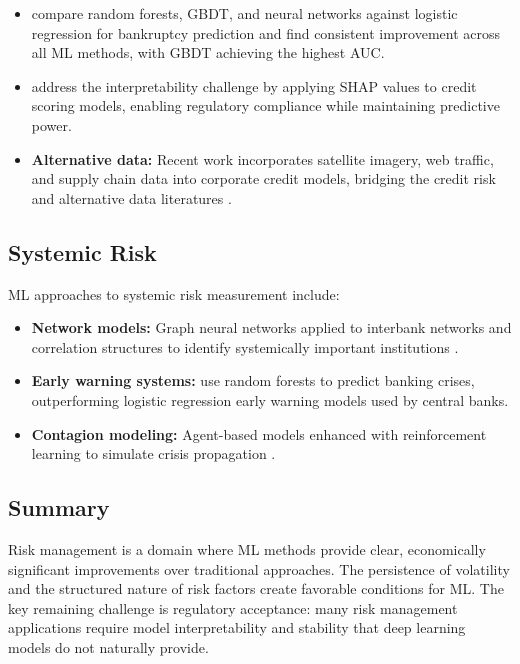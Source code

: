 \begin{itemize}[leftmargin=*]
    \item \citet{Barboza2017} compare random forests, GBDT, and neural networks against logistic regression for bankruptcy prediction and find consistent improvement across all ML methods, with GBDT achieving the highest AUC.

    \item \citet{Bussmann2021} address the interpretability challenge by applying SHAP values to credit scoring models, enabling regulatory compliance while maintaining predictive power.

    \item \textbf{Alternative data:} Recent work incorporates satellite imagery, web traffic, and supply chain data into corporate credit models, bridging the credit risk and alternative data literatures \citep{Suss2022}.
\end{itemize}

\subsection{Systemic Risk}

ML approaches to systemic risk measurement include:

\begin{itemize}[leftmargin=*]
    \item \textbf{Network models:} Graph neural networks applied to interbank networks and correlation structures to identify systemically important institutions \citep{Giudici2022}.
    \item \textbf{Early warning systems:} \citet{Holopainen2017} use random forests to predict banking crises, outperforming logistic regression early warning models used by central banks.
    \item \textbf{Contagion modeling:} Agent-based models enhanced with reinforcement learning to simulate crisis propagation \citep{Delli2022}.
\end{itemize}

\subsection{Summary}

Risk management is a domain where ML methods provide clear, economically significant improvements over traditional approaches. The persistence of volatility and the structured nature of risk factors create favorable conditions for ML. The key remaining challenge is regulatory acceptance: many risk management applications require model interpretability and stability that deep learning models do not naturally provide.
